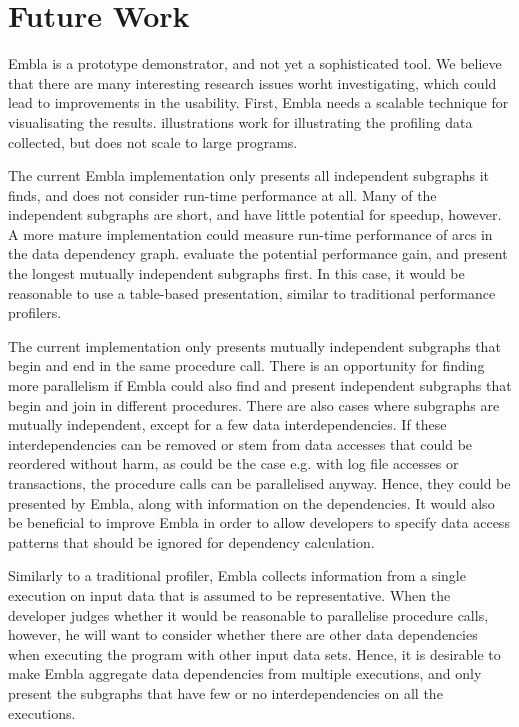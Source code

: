 %

\section{Future Work}

Embla is a prototype demonstrator, and not yet a sophisticated tool.  We
believe that there are many interesting research issues worht
investigating, which could lead to improvements in the usability.  First,
Embla needs a scalable technique for visualisating the results.  \latex
illustrations work for illustrating the profiling data collected, but does
not scale to large programs.  

The current Embla implementation only presents all independent subgraphs it
finds, and does not consider run-time performance at all.  Many of the
independent subgraphs are short, and have little potential for speedup,
however.  A more mature implementation could measure run-time performance
of arcs in the data dependency graph.  evaluate the potential performance
gain, and present the longest mutually independent subgraphs first.  In
this case, it would be reasonable to use a table-based presentation,
similar to traditional performance profilers.

The current implementation only presents mutually independent subgraphs
that begin and end in the same procedure call.  There is an opportunity for
finding more parallelism if Embla could also find and present independent
subgraphs that begin and join in different procedures.  There are also
cases where subgraphs are mutually independent, except for a few data
interdependencies.  If these interdependencies can be removed or stem from
data accesses that could be reordered without harm, as could be the case
e.g. with log file accesses or transactions, the procedure calls can be
parallelised anyway.  Hence, they could be presented by Embla, along with
information on the dependencies.  It would also be beneficial to improve
Embla in order to allow developers to specify data access patterns that
should be ignored for dependency calculation.

Similarly to a traditional profiler, Embla collects information from a
single execution on input data that is assumed to be representative.  When
the developer judges whether it would be reasonable to parallelise
procedure calls, however, he will want to consider whether there are other
data dependencies when executing the program with other input data sets.
Hence, it is desirable to make Embla aggregate data dependencies from
multiple executions, and only present the subgraphs that have few or no
interdependencies on all the executions.

